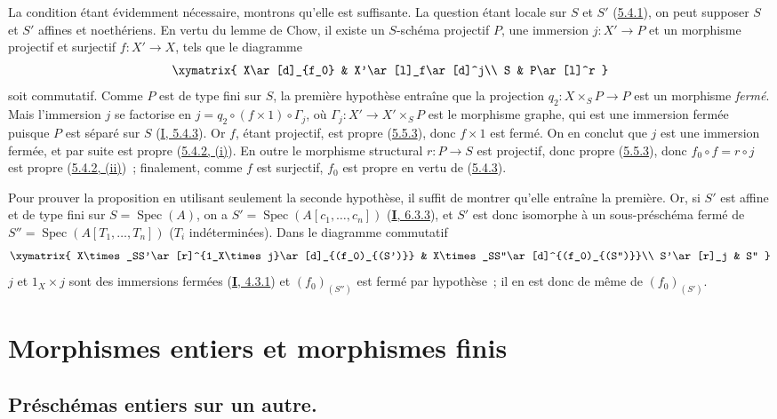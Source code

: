 La condition étant évidemment nécessaire, montrons qu'elle est suffisante.
La question étant locale sur $S$ et $S'$ (\hyperref[II.5.4.1-fr]{5.4.1}), on
peut supposer $S$ et $S'$ affines et noethériens. En vertu du lemme de Chow,
il existe un $S$-schéma projectif $P$, une immersion $j:X'\to P$ et un
morphisme projectif et surjectif $f:X'\to X$, tels que le diagramme
\[
\xymatrix{
X\ar[d]_{f_0} & X'\ar[l]_f\ar[d]^j\\
S & P\ar[l]^r
}
\]
soit commutatif. Comme $P$ est de type fini sur $S$, la première hypothèse
entraîne que la projection $q_2:X\times_SP\to P$ est un morphisme \emph{fermé}. Mais
l'immersion $j$ se factorise en $j=q_2\circ(f\times1)\circ\Gamma_j$,
où $\Gamma_j:X'\to X'\times_SP$ est le morphisme graphe, qui est une
immersion fermée puisque $P$ est séparé sur $S$
(\hyperref[I.5.4.3-fr]{I, 5.4.3}). Or $f$, étant projectif, est propre
(\hyperref[II.5.5.3-fr]{5.5.3}), donc $f\times1$ est fermé. On en conclut que
$j$ est une immersion fermée, et par suite est propre
(\hyperref[II.5.4.2-fr]{5.4.2, (i)}). En outre le morphisme structural
$r:P\to S$ est projectif, donc propre (\hyperref[II.5.5.3-fr]{5.5.3}), donc
$f_0\circ f=r\circ j$ est propre
(\hyperref[II.5.4.2-fr]{5.4.2, (ii)})~; finalement, comme $f$ est surjectif,
$f_0$ est propre en vertu de (\hyperref[II.5.4.3-fr]{5.4.3}).

Pour prouver la proposition en utilisant seulement la seconde hypothèse, il
suffit de montrer qu'elle entraîne la première. Or, si $S'$ est affine et de
type fini sur $S=\operatorname{Spec}(A)$,
on a $S'=\operatorname{Spec}(A[c_1,\ldots,c_n])$
(\hyperref[I.6.3.3-fr]{\textbf{I}, 6.3.3}), et $S'$ est donc isomorphe à un
sous-préschéma fermé de $S''=\operatorname{Spec}(A[T_1,\ldots,T_n])$ ($T_i$
indéterminées). Dans le diagramme commutatif
\[
\xymatrix{
X\times_SS'\ar[r]^{1_X\times j}\ar[d]_{(f_0)_{(S')}} &
X\times_SS''\ar[d]^{(f_0)_{(S'')}}\\
S'\ar[r]_j & S''
}
\]
$j$ et $1_X\times j$ sont des immersions fermées
(\hyperref[I.4.3.1-fr]{\textbf{I}, 4.3.1}) et $(f_0)_{(S'')}$ est fermé par hypothèse~;
il en est donc de même de $(f_0)_{(S')}$. 

\section{Morphismes entiers et morphismes finis}
\label{section:II.6-fr}

\subsection{Préschémas entiers sur un autre.}
\label{subsection:II.6.1-fr}

